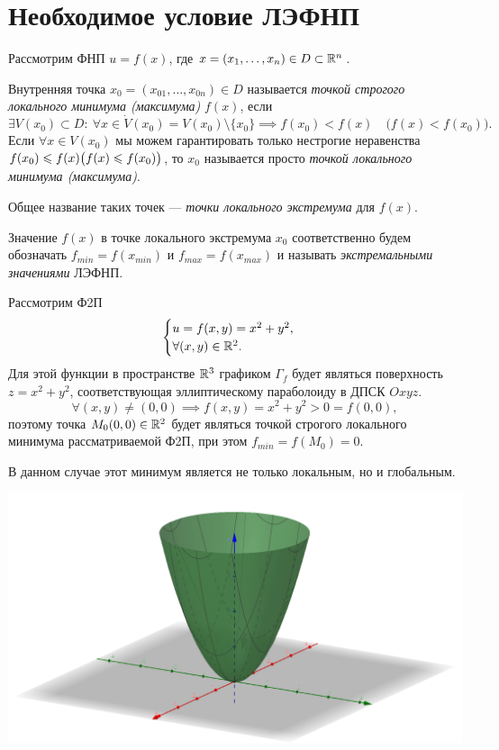 \documentclass[../../main.tex]{subfiles}
\begin{document}
	\section{Необходимое условие ЛЭФНП}
	Рассмотрим ФНП $u = f (x)$,
	где $x = (x_1, \ldots, x_n) \in D \subset \R^n$.
	
	Внутренняя точка $x_0 = (x_{0 1}, \ldots, x_{0n}) \in D$
	называется \emph{точкой строгого локального минимума (максимума)}
	$f(x)$,
	если
	\[
		\exists V (x_0) \subset D:
		\ \forall x \in \dot{V} (x_0)
		= V (x_0) \setminus \{x_0\}
		\implies f (x_0) < f (x)
		\quad \big(f (x) < f (x_0)\big).
	\]
	Если $\forall x \in V (x_0)$ мы можем гарантировать
	только нестрогие неравенства $f (x_0) \le f (x)
	\\ \displaystyle
	\big(f (x) \le f (x_0)\big)$,
	то $x_0$ называется просто \emph{точкой локального минимума (максимума)}.
	
	Общее название таких точек
	--- \emph{точки локального экстремума} для $f (x)$.
	
	Значение $f (x)$ в точке локального экстремума $x_0$
	соответственно будем обозначать
	$f_{min} = f (x_{min})$ и $f_{max} = f (x_{max})$
	и называть \emph{экстремальными значениями} ЛЭФНП.
	
	\begin{exmp}
		Рассмотрим Ф2П
		\[
		\begin{cases}
			u = f (x, y) = x^2 + y^2, \\
			\forall (x, y) \in \R^2. \\
		\end{cases}
		\]
		Для этой функции в пространстве $\R^3$ графиком $\Gamma_f$
		будет являться поверхность $z = x^2 + y^2$,
		соответствующая эллиптическому параболоиду в ДПСК $Oxyz$.
		\[
			\forall (x, y) \ne (0, 0)
			\implies
			f (x, y) = x^2 + y^2 > 0 = f (0, 0),
		\]
		поэтому точка $M_0 (0, 0) \in \R^2$
		будет являться точкой строгого локального минимума рассматриваемой Ф2П,
		при этом $f_{min} = f (M_0) = 0$.
		
		В данном случае
		этот минимум является не только локальным, но и глобальным.
		
		\includegraphics[width=0.9\linewidth]{Ellyptic_paraboloid}
		
	\end{exmp}
	
\end{document}
